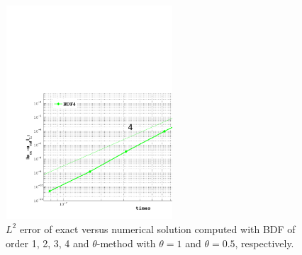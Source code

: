 \documentclass[english,a4paper]{article}
\begin{document}
\begin{figure}[!h]
\includegraphics[width=6.25cm, height=8cm]{figures/P11_order4.pdf}
\caption{$L^2$ error of exact versus numerical solution computed with  BDF of order 1, 2, 3, 4 and $\theta$-method with
$\theta=1$ and $\theta=0.5$, respectively.}\label{acc1}
\end{figure}


\newpage
\clearpage
\end{document}
